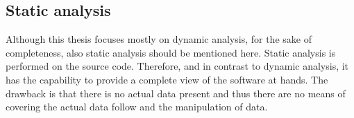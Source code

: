 \begin{comment}
\hl{TODO einfach weglassen? I will distinct here between two categories of dynamic analysis:}
\hl{TODO... ???}
\begin{itemize}
\item interactive\\
	The characteristics of interactive(stepped debugging, interpretative execution) approaches, is that the program is still executing during the analysis and thus time is a critical factor. This makes some analysis methods like performance analysis impossible. In networked environment, timeouts can make interactive analysis very hard.
\item non interactive(real-time and post-mortem)\\
	In real-time analysis(log analysis, trace analysis), data changes very quickly, which can make the task of tracking execution scenarios very resource intensive. In contrast, in post-mortem analysis(log analysis, trace analysis), the processing of very large files becomes a problem.
\end{itemize}


\begin{itemize}
\item \hl{INTEGRATE THIS?: observer effect} \\
Andrews, J. (1997). Testing using log file analysis: tools, methods, and issues.
In Proc. International Conference on Automated Software Engineering (ASE), pages 157–
166. IEEE Computer Society Press
\item scalability \\
Zaidman, A. (2006). Scalability Solutions for Program Comprehension through Dynamic
Analysis. PhD thesis, University of Antwerp
\item debugging -> different kind of paradigms and languages and tools\\
see @incollection{reiss1993trace,
title={Trace-based debugging},
author={Reiss, Steven P},
booktitle={Automated and Algorithmic Debugging},
pages={305--314},
year={1993},
publisher={Springer}
}
\end{itemize}
\end{comment}

\subsection{Static analysis}

Although this thesis focuses mostly on dynamic analysis, for the sake of completeness, also static analysis should be mentioned here.
Static analysis is performed on the source code. Therefore, and in contrast to dynamic analysis, it has the capability to provide a complete view of the software at hands. The drawback is that there is no actual data present and thus there are no means of covering the actual data follow and the manipulation of data.

